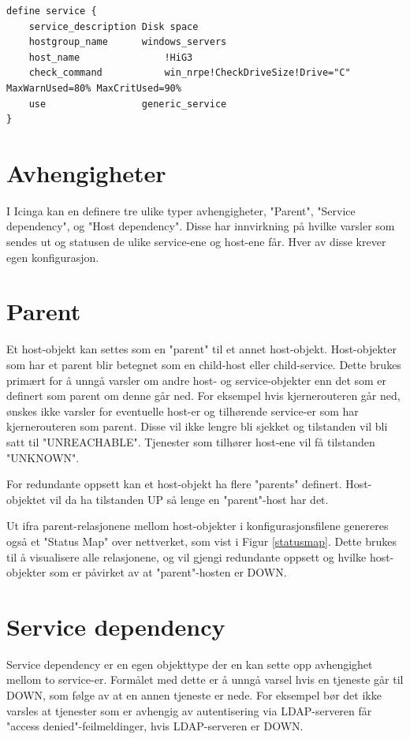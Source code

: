 \begin{lstlisting}
define service {
	service_description	Disk space
	hostgroup_name		windows_servers
	host_name               !HiG3
	check_command        	win_nrpe!CheckDriveSize!Drive="C" MaxWarnUsed=80% MaxCritUsed=90%
	use                	generic_service
}
\end{lstlisting}

\section{Avhengigheter}

I Icinga kan en definere tre ulike typer avhengigheter, "Parent", "Service dependency", og "Host dependency". Disse har innvirkning på hvilke varsler som sendes ut og statusen de ulike service-ene og host-ene får. Hver av disse krever egen konfigurasjon. 

\section{Parent}\label{sec:parent}
Et host-objekt kan settes som en "parent" til et annet host-objekt. Host-objekter som har et parent blir betegnet som en child-host eller child-service. Dette brukes primært for å unngå varsler om andre host- og service-objekter enn det som er definert som parent om denne går ned. For eksempel hvis kjernerouteren går ned, ønskes ikke varsler for eventuelle host-er og tilhørende service-er som har kjernerouteren som parent. Disse vil ikke lengre bli sjekket og tilstanden vil bli satt til "UNREACHABLE". Tjenester som tilhører host-ene vil få tilstanden "UNKNOWN".

For redundante oppsett kan et host-objekt ha flere "parents" definert. Host-objektet vil da ha tilstanden UP så lenge en "parent"-host har det.

Ut ifra parent-relasjonene mellom host-objekter i konfigurasjonsfilene genereres også et "Status Map" over nettverket, som vist i Figur \ref{statusmap}. Dette brukes til å visualisere alle relasjonene, og vil gjengi redundante oppsett og hvilke host-objekter som er påvirket av at "parent"-hosten er DOWN.

\section{Service dependency}\label{sec:servicedependency}

Service dependency er en egen objekttype der en kan sette opp avhengighet mellom to service-er. Formålet med dette er å unngå varsel hvis en tjeneste går til DOWN, som følge av at en annen tjeneste er nede. For eksempel bør det ikke varsles at tjenester som er avhengig av autentisering via LDAP-serveren får "access denied"-feilmeldinger, hvis LDAP-serveren er DOWN. 

